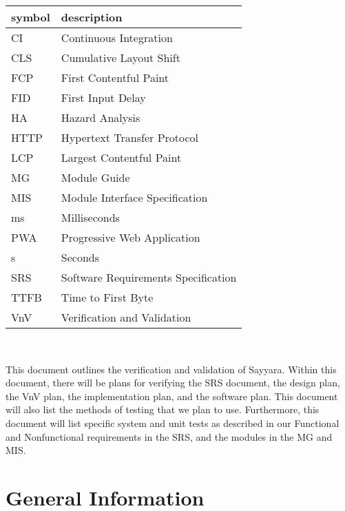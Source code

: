 \documentclass[12pt, titlepage]{article}
\begin{document}
\renewcommand{\arraystretch}{1.2}
\begin{tabular}{l l}
	\toprule
	\textbf{symbol} & \textbf{description}                \\
	\midrule
	CI              & Continuous Integration              \\
	CLS             & Cumulative Layout Shift             \\
	FCP             & First Contentful Paint              \\
	FID             & First Input Delay                   \\
	HA              & Hazard Analysis                     \\
	HTTP            & Hypertext Transfer Protocol         \\
	LCP             & Largest Contentful Paint            \\
	MG              & Module Guide                        \\
	MIS             & Module Interface Specification      \\
	ms              & Milliseconds                        \\
	PWA             & Progressive Web Application         \\
	s               & Seconds                             \\
	SRS             & Software Requirements Specification \\
	TTFB            & Time to First Byte                  \\
	VnV             & Verification and Validation         \\
	\bottomrule
\end{tabular}\\

\newpage


This document outlines the verification and validation of Sayyara. Within this document, there will
be plans for verifying the SRS document, the design plan, the VnV plan, the implementation plan,
and the software plan. This document will also list the methods of testing that we plan to use.
Furthermore, this document will list specific system and unit tests as described in our Functional
and Nonfunctional requirements in the SRS, and the modules in the MG and MIS.

\section{General Information}
\end{document}
